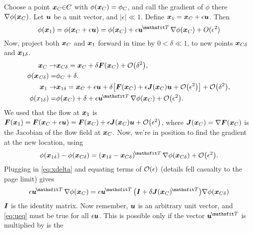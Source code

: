 Choose a point ${\vb{x}}_{C}{\in}C$ with
$\phi({\vb{x}}_{C})={\phi}_{C}$, and call the gradient of $\phi$
there ${\nabla}\phi({\vb{x}}_{C})$. Let $\vb{u}$ be a unit vector, and
$|\epsilon|{\ll}1$. Define
${\vb{x}}_{1}={\vb{x}}_{C}+\epsilon\vb{u}$. Then  
\begin{equation}
\phi ({\vb{x}}_{1})=\phi({\vb{x}}_{C}+\epsilon\vb{u})
=\phi({\vb{x}}_{C}) + \epsilon{\vb{u}}^{\T}\,{\nabla}\phi
({\vb{x}}_{C})+O({\epsilon }^{2})
\end{equation}
Now, project both $\vb{x}_{C}$ and $\vb{x}_{1}$ forward in time by 
$0<\delta\ll1$, to new points $\vb{x}_{C\delta}$ and 
$\vb{x}_{1\delta}$. 
\begin{equation}\label{eq:xdelta}
\begin{aligned}
{\vb{x}}_{C}\to& \vb{x}_{C\delta}
=\vb{x}_{C}+\delta\vb{F}({\vb{x}}_{C})+\order{\delta^2},\\
\phi({\vb{x}}_{\mathit{C\delta }})=&{\phi}_{C}+\delta. \\
\vb{x}_1\to& \vb{x}_{1\delta}
 =\vb{x}_{C}+\epsilon \vb{u}+
  \delta\qty[\vb{F}(\vb{x}_{C})+\epsilon \vb{J}(\vb{x}_{C})\vb{u}
  +\order{\epsilon^2}]+\order{\delta^2},\\
\phi({x}_{1\delta })=&\phi(\vb{x}_{C}) + \delta 
 +\epsilon {\vb{u}}^{\T}\,{\nabla}\phi(\vb{x}_{C})
 +\order{\epsilon^2}.
\end{aligned}
\end{equation}
We used that the flow at $\vb{x}_{1}$ is 
$\vb{F}(\vb{x}_{1})
=\vb{F}(\vb{x}_{C}+\epsilon\vb{u})
=\vb{F}(\vb{x}_{C})+\epsilon\vb{J}(\vb{x}_{C})\vb{u}+\order{\epsilon^2}$, where 
$\vb{J}(\vb{x}_{C})={\nabla}\vb{F}(\vb{x}_{C})$ is the Jacobian of the
flow field at $\vb{x}_{C}$. Now, we're in position to find the gradient
at the new location, using
\begin{equation}
\phi(\vb{x}_{1\delta })-\phi(\vb{x}_{C\delta})
=(\vb{x}_{1\delta }-\vb{x}_{C\delta})^{\T}\,
{\nabla}\phi(\vb{x}_{C\delta})+\order{\epsilon^2}.
\end{equation}
Plugging in \eqref{eq:xdelta} and equating terms of $\order{\epsilon}$ 
(details fell casualty to the page limit) gives
\begin{equation}\label{eq:ueq}
\epsilon {\vb{u}}^{\T}\,{\nabla}\phi(\vb{x}_{C})=\epsilon
{\vb{u}}^{\T}\,\qty(\I+\delta\vb{J}(\vb{x}_{C})^{\T})
{\nabla}\phi(\vb{x}_{C\delta})
\end{equation}
$\I$ is the identity matrix. Now remember, $\vb{u}$ is an
arbitrary unit vector, and \eqref{eq:ueq} must be true for all $\epsilon\vb{u}$. This
is possible only if the vector ${\vb{u}}^{\T}$ is multiplied by is the
